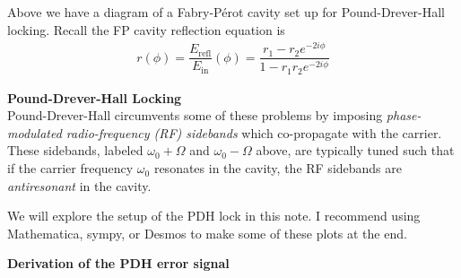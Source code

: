 \documentclass[11pt]{article}
\begin{document}
\begin{center}
\end{center}

Above we have a diagram of a Fabry-P\'erot cavity set up for Pound-Drever-Hall locking.
Recall the FP cavity reflection equation is 
\begin{align}
r(\phi) = \dfrac{E_\mathrm{refl}}{E_\mathrm{in}}(\phi) = \dfrac{r_1 - r_2 e^{-2 i \phi}}{1 - r_1 r_2 e^{-2 i \phi}}
\end{align} 

\noindent
\textbf{Pound-Drever-Hall Locking}\\
Pound-Drever-Hall circumvents some of these problems by imposing \textit{phase-modulated radio-frequency (RF) sidebands} which co-propagate with the carrier.
These sidebands, labeled \textcolor{BurntOrange}{$\omega_0 + \Omega$} and \textcolor{WildStrawberry}{$\omega_0 - \Omega$} above, are typically tuned such that if the carrier frequency $\omega_0$ resonates in the cavity, the RF sidebands are \textit{antiresonant} in the cavity.

We will explore the setup of the PDH lock in this note.
I recommend using Mathematica, sympy, or Desmos to make some of these plots at the end.

\newpage 

\noindent
\textbf{Derivation of the PDH error signal}
\end{document}
